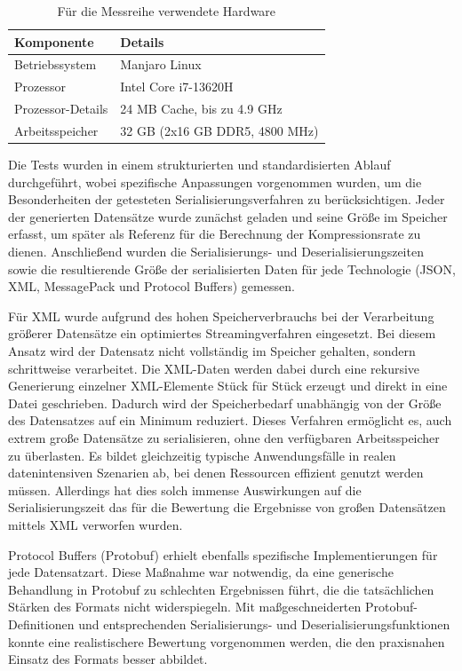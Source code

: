\documentclass[ngerman]{seminarvorlage}
\begin{document}
\begin{table}[h!]
\centering
\begin{tabular}{|l|l|}
\hline
\textbf{Komponente}         & \textbf{Details}                     \\ \hline
Betriebssystem              & Manjaro Linux                        \\ \hline
Prozessor                   & Intel Core i7-13620H                 \\ \hline
Prozessor-Details           & 24 MB Cache, bis zu 4.9 GHz           \\ \hline
Arbeitsspeicher             & 32 GB (2x16 GB DDR5, 4800 MHz)       \\ \hline
\end{tabular}
\caption{Für die Messreihe verwendete Hardware}
\label{tab:hardware}
\end{table}

Die Tests wurden in einem strukturierten und standardisierten Ablauf durchgeführt, wobei spezifische Anpassungen vorgenommen wurden, um die Besonderheiten der getesteten Serialisierungsverfahren zu berücksichtigen. Jeder der generierten Datensätze wurde zunächst geladen und seine Größe im Speicher erfasst, um später als Referenz für die Berechnung der Kompressionsrate zu dienen. Anschließend wurden die Serialisierungs- und Deserialisierungszeiten sowie die resultierende Größe der serialisierten Daten für jede Technologie (JSON, XML, MessagePack und Protocol Buffers) gemessen.

Für XML wurde aufgrund des hohen Speicherverbrauchs bei der Verarbeitung größerer Datensätze ein optimiertes Streamingverfahren eingesetzt. Bei diesem Ansatz wird der Datensatz nicht vollständig im Speicher gehalten, sondern schrittweise verarbeitet. Die XML-Daten werden dabei durch eine rekursive Generierung einzelner XML-Elemente Stück für Stück erzeugt und direkt in eine Datei geschrieben. Dadurch wird der Speicherbedarf unabhängig von der Größe des Datensatzes auf ein Minimum reduziert. Dieses Verfahren ermöglicht es, auch extrem große Datensätze zu serialisieren, ohne den verfügbaren Arbeitsspeicher zu überlasten. Es bildet gleichzeitig typische Anwendungsfälle in realen datenintensiven Szenarien ab, bei denen Ressourcen effizient genutzt werden müssen. Allerdings hat dies solch immense Auswirkungen auf die Serialisierungszeit das für die Bewertung die Ergebnisse von großen Datensätzen mittels XML verworfen wurden.

Protocol Buffers (Protobuf) erhielt ebenfalls spezifische Implementierungen für jede Datensatzart. Diese Maßnahme war notwendig, da eine generische Behandlung in Protobuf zu schlechten Ergebnissen führt, die die tatsächlichen Stärken des Formats nicht widerspiegeln. Mit maßgeschneiderten Protobuf-Definitionen und entsprechenden Serialisierungs- und Deserialisierungsfunktionen konnte eine realistischere Bewertung vorgenommen werden, die den praxisnahen Einsatz des Formats besser abbildet.
\end{document}
